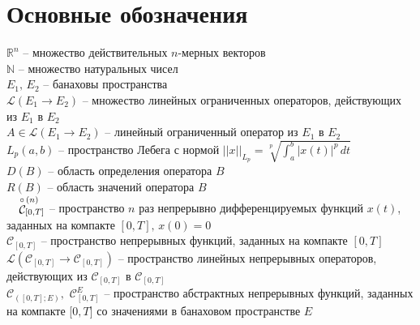 \chapter*{Основные обозначения}


\noindent $\mathbb{R}^n$ -- множество  действительных $n$-мерных векторов\\

\noindent $\mathbb{N}$ -- множество  натуральных чисел\\

\noindent $E_1,\, E_2$ -- банаховы пространства\\

\noindent  $\mathcal{L}(E_1 \rightarrow  E_2) $ -- множество линейных ограниченных операторов, действующих из $E_1 $ в $E_2$\\

\noindent  $A\in \mathcal{L}(E_1 \rightarrow  E_2) $ --  линейный ограниченный оператор  из $E_1 $ в $E_2$\\


\noindent $L_p(a,b)$ -- пространство Лебега с нормой $||x||_{L_p} = \sqrt[p]{\int_a^b |x(t)|^p \, dt}$ \\

\noindent $D(B)$  -- область определения оператора $B$\\

\noindent $R(B)$ -- область значений оператора $B$\\


\noindent\hspace*{-0.4cm}$\stackrel{\hspace{3.9mm} \circ\,(n)}{\mathcal{C}}_{\hspace{-5mm}\,\,[0,\sc T]} $ -- пространство $n$ раз непрерывно дифференцируемых функций $x(t)$, заданных на компакте $[0,T],\, x(0)=0$\\

\noindent $\mathcal{C}_{[0,T]}$ --  пространство  непрерывных функций, заданных на компакте $[0,T]$ \\

\noindent $\mathcal{L}(\mathcal{C}_{[0,T]} \rightarrow \mathcal{C}_{[0,T]}) $ -- пространство линейных непрерывных операторов, действующих из $\mathcal{C}_{[0,T]} $ в $ \mathcal{C}_{[0,T]}$\\

\noindent $\mathcal{C}_{([0,T];E)}, $  $\mathcal{C}_{[0,T]}^{E}$ --  пространство абстрактных непрерывных функций, заданных на компакте [$0,T]$ со значениями в  банаховом пространстве  $E$\\

